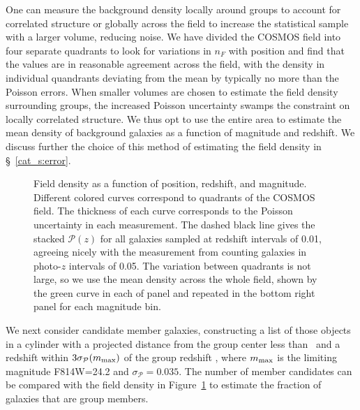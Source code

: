 One can measure the background density locally around groups to
account for correlated structure or globally across the field to
increase the statistical sample with a larger volume, reducing
noise. We have divided the COSMOS field into four separate quadrants
to look for variations in $n_F$ with position and find that
the values are in reasonable agreement across the field, with
the density in individual quandrants deviating from the mean by typically
no more than the Poisson errors. When smaller volumes are chosen to estimate
the field density surrounding groups, the increased Poisson
uncertainty swamps the constraint on locally correlated structure. We
thus opt to use the entire area to estimate the mean density of
background galaxies as a function of magnitude and redshift. We
discuss further the choice of this method of estimating the field density
in \S~\ref{cat_s:error}.

\begin{figure}
\caption{Field density as a function of position, redshift, and
  magnitude. Different colored curves correspond to quadrants of the COSMOS
  field. The thickness of each curve corresponds to the Poisson
  uncertainty in each measurement. The dashed black line gives the
  stacked $\mathcal{P}(z)$ for all galaxies sampled at redshift
  intervals of 0.01, agreeing nicely with the measurement from
  counting galaxies in photo-$z$ intervals of 0.05. The variation between
  quadrants is not large, so we use the mean density across the whole
  field, shown by the green curve in each of panel and repeated in the
  bottom right panel for each magnitude bin.}
\label{cat_fig:fielddensity}
\end{figure}

We next consider candidate member galaxies, constructing a list of
those objects in a cylinder with a projected distance from the group center less
than \rvir\ and a redshift within $3\sigma_{\mathcal{P}}(m_{\rm max})$ of the
group redshift \zG, where $m_{\rm max}$ is the limiting magnitude
F814W=24.2 and $\sigma_{\mathcal{P}}=0.035$. The number of member
candidates can be compared with the field density in
Figure~\ref{cat_fig:fielddensity} to estimate the fraction of galaxies
that are group members.

